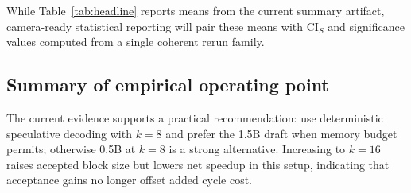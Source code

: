 While Table~\ref{tab:headline} reports means from the current summary artifact,
camera-ready statistical reporting will pair these means with CI$_S$ and
significance values computed from a single coherent rerun family.

\subsection{Summary of empirical operating point}

The current evidence supports a practical recommendation: use deterministic
speculative decoding with $k{=}8$ and prefer the 1.5B draft when memory budget
permits; otherwise 0.5B at $k{=}8$ is a strong alternative. Increasing to
$k{=}16$ raises accepted block size but lowers net speedup in this setup,
indicating that acceptance gains no longer offset added cycle cost.
